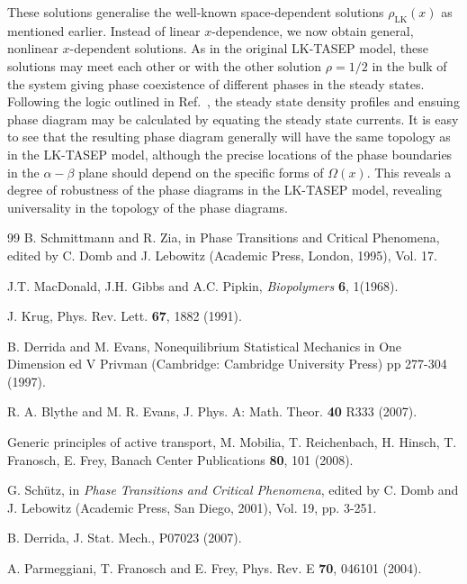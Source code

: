 \documentclass[aps,pre,twocolumn,superscriptaddress,amsmath,amssymb,longbibliography,floatfix]{revtex4}
\begin{document}
{These solutions generalise the well-known space-dependent solutions $\rho_\text{LK}(x)$ as mentioned earlier. Instead of linear $x$-dependence, we now obtain general, nonlinear $x$-dependent solutions. As in the original LK-TASEP model, these solutions may meet each other or with the other solution $\rho=1/2$ in the bulk of the system giving phase coexistence of different phases in the steady states. Following the logic outlined in Ref.~\cite{frey-lktasep}, the steady state density profiles and ensuing phase diagram may be calculated by equating the steady state currents. It is easy to see that the resulting phase diagram generally will have the same topology as in the LK-TASEP model, although the precise locations of the phase boundaries in the $\alpha-\beta$ plane should depend on the specific forms of $\Omega(x)$. This reveals a degree of robustness of the phase diagrams in the LK-TASEP model, revealing universality in the topology of the phase diagrams.



\begin{thebibliography}{99}
 B. Schmittmann and R. Zia, in Phase Transitions and Critical
Phenomena, edited by C. Domb and J. Lebowitz (Academic
Press, London, 1995), Vol. 17.

  J.T. MacDonald, J.H. Gibbs and A.C. Pipkin, {\em Biopolymers} {\bf 6}, 1(1968).
 
  J. Krug, Phys. Rev. Lett. {\bf 67}, 1882 (1991).


 B. Derrida  and M. Evans,   Nonequilibrium Statistical Mechanics in One Dimension ed V Privman (Cambridge: Cambridge University Press) pp 277-304 (1997).

 R. A. Blythe and M. R. Evans,  J. Phys. A: Math. Theor. {\bf 40} R333  (2007).

 Generic principles of active transport, M. Mobilia, T. Reichenbach, H. Hinsch, T. Franosch, E. Frey,
Banach Center Publications {\bf 80}, 101 (2008).

 G. Sch\"{u}tz, in {\em Phase Transitions and Critical Phenomena}, edited
 by C. Domb and J. Lebowitz (Academic Press, San Diego,
 2001), Vol. 19, pp. 3-251.


 B. Derrida,  J. Stat. Mech., P07023 (2007).

 A. Parmeggiani, T. Franosch and E. Frey,  Phys. Rev. E {\bf 70}, 046101 (2004).



\end{thebibliography}}
\end{document}
